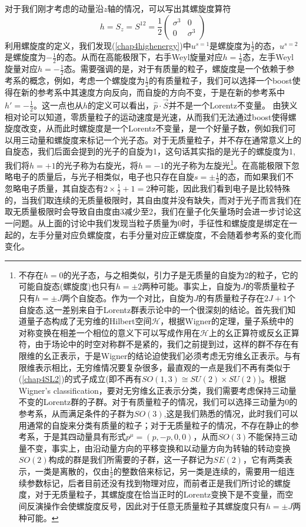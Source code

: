 对于我们刚才考虑的动量沿$z$轴的情况，可以写出其螺旋度算符
\begin{equation}
    h=S_{z}=S^{12}=\frac{1}{2}\left(\begin{array}{cc}
       \sigma^{3}  &0  \\
        0 & \sigma^{3}
    \end{array}\right)
\end{equation}
利用螺旋度的定义，我们发现(\ref{chap4highenergy})中$u^{s=1}$是螺旋度为$\frac{1}{2}$的态，$u^{s=2}$是螺旋度为$-\frac{1}{2}$的态。从而在高能极限下，右手Weyl旋量对应$h=\frac{1}{2}$态，左手Weyl旋量对应$h=-\frac{1}{2}$态。需要强调的是，对于有质量的粒子，螺旋度是一个依赖于参考系的概念，例如，考虑一个螺旋度为$\frac{1}{2}$的有质量粒子，我们可以选择一个boost使得在新的参考系中其速度方向反向，而自旋的方向不变，于是在新的参考系中$h'=-\frac{1}{2}$。这一点也从$h$的定义可以看出，$\hat{p}\cdot \vec{S}$并不是一个Lorentz不变量。
由狭义相对论可以知道，零质量粒子的运动速度是光速，从而我们无法通过boost使得螺旋度改变，从而此时螺旋度是一个Lorentz不变量，是一个好量子数，例如我们可以用三动量和螺旋度来标记一个光子态。对于无质量粒子，并不存在通常意义上的自旋态，我们后面会提到的光子的自旋为1，这句话其实指的是光子的螺旋度为1,我们将$h=+1$的光子称为右旋光，将$h=-1$的光子称为左旋光\footnote{不存在$h=0$的光子态，与之相类似，引力子是无质量的自旋为2的粒子，它的可能自旋态(螺旋度)也只有$h=\pm2$两种可能。事实上，自旋为$J$的零质量粒子只有$h=\pm J$两个自旋态。作为一个对比，自旋为$J$的有质量粒子存在$2J+1$个自旋态,这一差别来自于Lorentz群表示论中的一个很深刻的结论。首先我们知道量子态构成了无穷维的Hilbert空间$\mathcal{H}$，根据Wigner的定理，量子系统中的对称变换在相差一个相位的意义下可以写成作用在$\mathcal{H}$上的幺正算符或反幺正算符，由于场论中的时空对称群不是紧的，我们之前提到过，这样的群不存在有限维的幺正表示，于是Wigner的结论迫使我们必须考虑无穷维幺正表示。与有限维表示相比，无穷维情况要复杂很多，最直观的一点是我们不再有类似于(\ref{chap4SL2})的式子成立(即不再有$SO(1,3)\cong SU(2)\times SU(2)$)。根据Wigner's classification，要对无穷维幺正表示分类，我们需要考虑保持三动量不变的Lorentz群的子群。对于有质量粒子的情况，我们可以选择三动量为0的参考系，从而满足条件的子群为$SO(3)$,这是我们熟悉的情况，此时我们可以用通常的自旋来分类有质量的粒子；对于无质量粒子的情况，不存在静止的参考系，于是其四动量具有形式$p^{\mu}=(p,-p,0,0)$，从而$SO(3)$不能保持三动量不变，事实上，由沿动量方向的平移变换和以动量方向为转轴的转动变换$SO(2)$构成的群是我们所需要的子群，这一子群记为$SE(2)$，它有两类表示，一类是离散的，仅由$\frac{1}{2}$的整数倍来标记，另一类是连续的，需要用一组连续参数标记，后者目前还没有找到物理对应，而前者正是我们所讨论的螺旋度，对于无质量粒子，其螺旋度在恰当正时的Lorentz变换下是不变量，而空间反演操作会使螺旋度反号，因此对于任意无质量粒子其螺旋度只有$h=\pm J$两种可能。}。在高能极限下忽略电子的质量后，与光子相类似，电子也只存在自旋$s=\pm\frac{1}{2}$的态，而如果我们不忽略电子质量，其自旋态有$2\times \frac{1}{2}+1=2$种可能，因此我们看到电子是比较特殊的，当我们取连续的无质量极限时，其自由度并没有缺失，而对于光子而言我们在取无质量极限时会导致自由度由3减少至2，我们在量子化矢量场时会进一步讨论这一问题。从上面的讨论中我们发现当粒子质量为0时，手征性和螺旋度是绑定在一起的，左手分量对应负螺旋度，右手分量对应正螺旋度，不会随着参考系的变化而变化。

